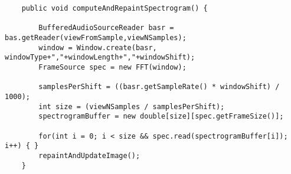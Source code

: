 \begin{verbatim}
	public void computeAndRepaintSpectrogram() {
	
	    BufferedAudioSourceReader basr = bas.getReader(viewFromSample,viewNSamples);	
	    window = Window.create(basr, windowType+","+windowLength+","+windowShift);
	    FrameSource spec = new FFT(window);
	    
	    samplesPerShift = ((basr.getSampleRate() * windowShift) / 1000);		
	    int size = (viewNSamples / samplesPerShift);
	    spectrogramBuffer = new double[size][spec.getFrameSize()];
	     
	    for(int i = 0; i < size && spec.read(spectrogramBuffer[i]); i++) { }
	    repaintAndUpdateImage();
	}
\end{verbatim}
